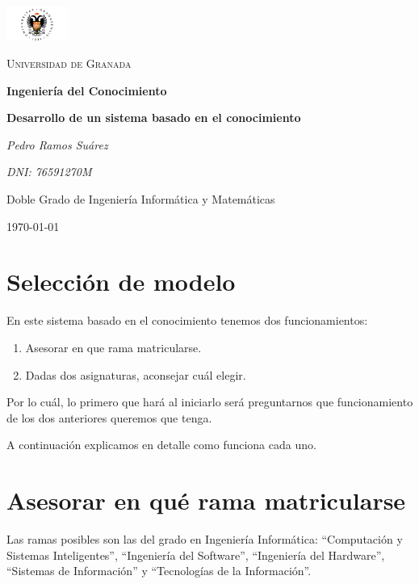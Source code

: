 \documentclass[11pt,a4paper]{article}
\begin{document}
\begin{titlepage}
\centering
\includegraphics[width=0.15\textwidth]{./UGR.png}\par\vspace{1cm}
{\scshape\LARGE Universidad de Granada \par}
\vspace{1cm}
\vspace{1.5cm}
{\huge\bfseries Ingeniería del Conocimiento\par}
\vspace{2cm}
{\LARGE\bfseries Desarrollo de un sistema basado en el conocimiento\par}
\vspace{2cm}
{\Large\itshape Pedro Ramos Suárez\par}
\vspace{2cm}
{\Large\itshape DNI: 76591270M \par}
\vfill
Doble Grado de Ingeniería Informática y Matemáticas
\vfill
{\large \today\par}
\end{titlepage}

\tableofcontents

\newpage

\section{Selección de modelo}

En este sistema basado en el conocimiento tenemos dos funcionamientos:
\begin{enumerate}[label = \arabic*.]
\item Asesorar en que rama matricularse.
\item Dadas dos asignaturas, aconsejar cuál elegir.
\end{enumerate}

Por lo cuál, lo primero que hará al iniciarlo será preguntarnos que funcionamiento de los dos anteriores queremos que tenga.

A continuación explicamos en detalle como funciona cada uno.

\section{Asesorar en qué rama matricularse}

Las ramas posibles son las del grado en Ingeniería Informática: ``Computación y Sistemas Inteligentes'', ``Ingeniería del Software'', ``Ingeniería del Hardware'', ``Sistemas de Información'' y ``Tecnologías de la Información''.
\end{document}
